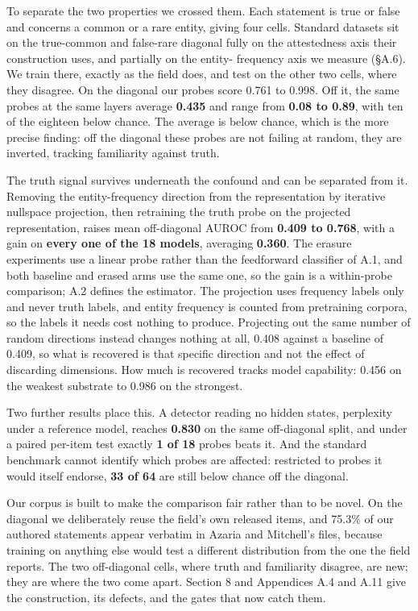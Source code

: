 \documentclass[10pt]{article}
\begin{document}
To separate the two properties we crossed them. Each statement is true or false and concerns a common or a rare entity, giving four cells. Standard datasets sit on the true-common and false-rare diagonal fully on the attestedness axis their construction uses, and partially on the entity- frequency axis we measure (§A.6). We train there, exactly as the field does, and test on the other two cells, where they disagree. On the diagonal our probes score 0.761 to 0.998. Off it, the same probes at the same layers average \textbf{0.435} and range from \textbf{0.08 to 0.89}, with ten of the eighteen below chance. The average is below chance, which is the more precise finding: off the diagonal these probes are not failing at random, they are inverted, tracking familiarity against truth.

The truth signal survives underneath the confound and can be separated from it. Removing the entity-frequency direction from the representation by iterative nullspace projection, then retraining the truth probe on the projected representation, raises mean off-diagonal AUROC from \textbf{0.409 to 0.768}, with a gain on \textbf{every one of the 18 models}, averaging \textbf{0.360}. The erasure experiments use a linear probe rather than the feedforward classifier of A.1, and both baseline and erased arms use the same one, so the gain is a within-probe comparison; A.2 defines the estimator. The projection uses frequency labels only and never truth labels, and entity frequency is counted from pretraining corpora, so the labels it needs cost nothing to produce. Projecting out the same number of random directions instead changes nothing at all, 0.408 against a baseline of 0.409, so what is recovered is that specific direction and not the effect of discarding dimensions. How much is recovered tracks model capability: 0.456 on the weakest substrate to 0.986 on the strongest.

Two further results place this. A detector reading no hidden states, perplexity under a reference model, reaches \textbf{0.830} on the same off-diagonal split, and under a paired per-item test exactly \textbf{1 of 18} probes beats it. And the standard benchmark cannot identify which probes are affected: restricted to probes it would itself endorse, \textbf{33 of 64} are still below chance off the diagonal.

Our corpus is built to make the comparison fair rather than to be novel. On the diagonal we deliberately reuse the field's own released items, and 75.3\% of our authored statements appear verbatim in Azaria and Mitchell's files, because training on anything else would test a different distribution from the one the field reports. The two off-diagonal cells, where truth and familiarity disagree, are new; they are where the two come apart. Section 8 and Appendices A.4 and A.11 give the construction, its defects, and the gates that now catch them.
\end{document}
